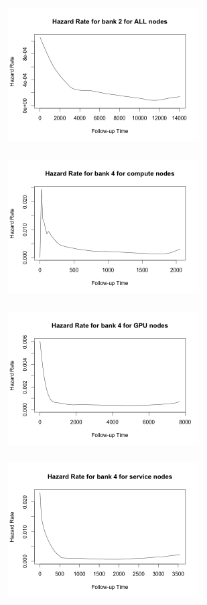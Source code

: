 \begin{figure}
\centering
\includegraphics[width=0.45\textwidth]{images/haz_2_a.png}
\end{figure}

\begin{figure}
\centering
\includegraphics[width=0.45\textwidth]{images/haz_4_c.png}
\end{figure}

\begin{figure}
\centering
\includegraphics[width=0.45\textwidth]{images/haz_4_g.png}
\end{figure}

\begin{figure}
\centering
\includegraphics[width=0.45\textwidth]{images/haz_4_s.png}
\end{figure}


